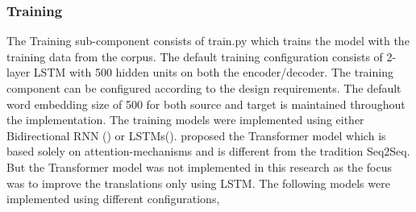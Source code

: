 \subsubsection{Training}
\label{opennmtmodels}
The Training sub-component consists of train.py which trains the model with the training data from the corpus. The default training configuration consists of 2-layer LSTM with 500 hidden units on both the encoder/decoder. The training component can be configured according to the design requirements. The default word embedding size of 500 for both source and target is maintained throughout the implementation. The training models were implemented using either Bidirectional RNN (\cite{45610}) or LSTMs(\cite{NIPS2014_5346}). \cite{DBLP:journals/corr/VaswaniSPUJGKP17} proposed the Transformer model which is based solely on attention-mechanisms and is different from the tradition Seq2Seq. But the Transformer model was not implemented in this research as the focus was to improve the translations only using LSTM. The following models were implemented using different configurations,
